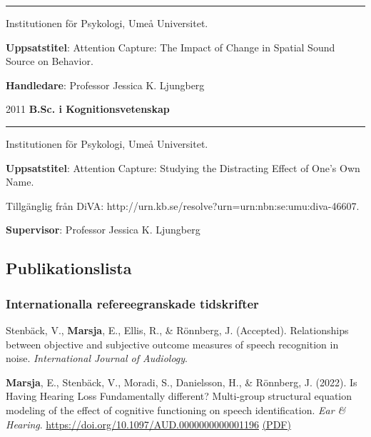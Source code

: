 \documentclass[]{article}
\begin{document}
\hrule
\begin{changemargin}{2.3cm}{2.4cm}

Institutionen för Psykologi, Umeå Universitet.

\textbf{Uppsatstitel}: Attention Capture: The Impact of Change in Spatial Sound Source on Behavior. 
    
\textbf{Handledare}: Professor Jessica K. Ljungberg
\end{changemargin}

2011 \hspace{1.5cm}\textbf{B.Sc. i Kognitionsvetenskap}\vspace{1mm}

\hrule

\begin{changemargin}{2.3cm}{2.4cm}

Institutionen för Psykologi, Umeå Universitet.

\textbf{Uppsatstitel}:  Attention Capture: Studying the Distracting Effect of One’s Own Name.

Tillgänglig från DiVA: \sloppy http://urn.kb.se/resolve?urn=urn:nbn:se:umu:diva-46607.
    
\textbf{Supervisor}: Professor Jessica K. Ljungberg
\end{changemargin}

\hypertarget{publikationslista}{%
\subsection{Publikationslista}\label{publikationslista}}

\hypertarget{internationalla-refereegranskade-tidskrifter}{%
\subsubsection{Internationalla refereegranskade
tidskrifter}\label{internationalla-refereegranskade-tidskrifter}}

Stenbäck, V., \textbf{Marsja}, E., Ellis, R., \& Rönnberg, J.
(Accepted). Relationships between objective and subjective outcome
measures of speech recognition in noise. \emph{International Journal of
Audiology}.

\textbf{Marsja}, E., Stenbäck, V., Moradi, S., Danielsson, H., \&
Rönnberg, J. (2022). Is Having Hearing Loss Fundamentally different?
Multi-group structural equation modeling of the effect of cognitive
functioning on speech identification. \emph{Ear \& Hearing}.
\url{https://doi.org/10.1097/AUD.0000000000001196}
\href{https://bit.ly/EANDH22}{(PDF)}
\end{document}
